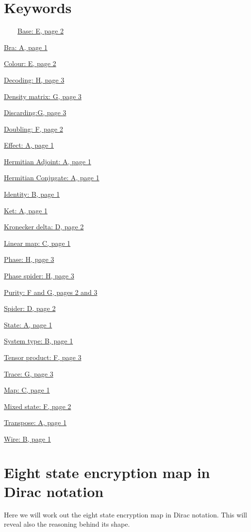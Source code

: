 \documentclass[]{article}
\begin{document}

\section{Keywords}
\label{Keywords}


~~~~\hyperref[coloursandbases]{Base: E, page 2}

\hyperref[braandket]{Bra: A, page 1}

\hyperref[coloursandbases]{Colour: E, page 2}

\hyperref[phasespiders]{Decoding: H, page 3}

\hyperref[discarding]{Density matrix: G, page 3}

\hyperref[discarding]{Discarding:G, page 3}

\hyperref[doubling]{Doubling: F, page 2}

\hyperref[braandket]{Effect: A, page 1}

\hyperref[braandket]{Hermitian Adjoint: A, page 1}

\hyperref[braandket]{Hermitian Conjugate: A, page 1}

\hyperref[identity]{Identity: B, page 1}

\hyperref[braandket]{Ket: A, page 1}

\hyperref[spiders]{Kronecker delta: D, page 2}

\hyperref[maps]{Linear map: C, page 1}

\hyperref[phasespiders]{Phase: H, page 3}

\hyperref[phasespiders]{Phase spider: H, page 3}

\hyperref[doubling]{Purity: F and G, pages 2 and 3}

\hyperref[spiders]{Spider: D, page 2}

\hyperref[braandket]{State: A, page 1}

\hyperref[identity]{System type: B, page 1}

\hyperref[doubling]{Tensor product: F, page 3}

\hyperref[discarding]{Trace: G, page 3}

\hyperref[maps]{Map: C, page 1}

\hyperref[doubling]{Mixed state: F, page 2}

\hyperref[braandket]{Transpose: A, page 1}

\hyperref[identity]{Wire: B, page 1}

\section{Eight state encryption map in Dirac notation}
\label{appendix:EightStateEncryptionMapDirac}
Here we will work out the eight state encryption map in Dirac notation. This will reveal also the reasoning behind its shape. 
\end{document}
